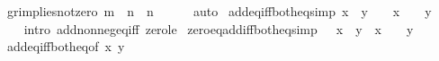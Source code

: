 \begin{isabellebody}
\endisatagproof
{\isafoldproof}%
%
\isadelimproof
\isanewline
%
\endisadelimproof
\isanewline
{}\isamarkupfalse%
\ gr{\isacharunderscore}{\kern0pt}implies{\isacharunderscore}{\kern0pt}not{\isacharunderscore}{\kern0pt}zero{\isacharcolon}{\kern0pt}\ {\isachardoublequoteopen}m\ {\isacharless}{\kern0pt}\ n\ {\isasymLongrightarrow}\ n\ {\isasymnoteq}\ {}{\isachardoublequoteclose}\isanewline
%
\isadelimproof
\ \ %
\endisadelimproof
%
\isatagproof
{}\isamarkupfalse%
\ auto%
\endisatagproof
{\isafoldproof}%
%
\isadelimproof
\isanewline
%
\endisadelimproof
\isanewline
{}\isamarkupfalse%
\ add{\isacharunderscore}{\kern0pt}eq{\isacharunderscore}{\kern0pt}{}{\isacharunderscore}{\kern0pt}iff{\isacharunderscore}{\kern0pt}both{\isacharunderscore}{\kern0pt}eq{\isacharunderscore}{\kern0pt}{}{\isacharbrackleft}{\kern0pt}simp{\isacharbrackright}{\kern0pt}{\isacharcolon}{\kern0pt}\ {\isachardoublequoteopen}x\ {\isacharplus}{\kern0pt}\ y\ {\isacharequal}{\kern0pt}\ {}\ {\isasymlongleftrightarrow}\ x\ {\isacharequal}{\kern0pt}\ {}\ {\isasymand}\ y\ {\isacharequal}{\kern0pt}\ {}{\isachardoublequoteclose}\isanewline
%
\isadelimproof
\ \ %
\endisadelimproof
%
\isatagproof
{}\isamarkupfalse%
\ {\isacharparenleft}{\kern0pt}intro\ add{\isacharunderscore}{\kern0pt}nonneg{\isacharunderscore}{\kern0pt}eq{\isacharunderscore}{\kern0pt}{}{\isacharunderscore}{\kern0pt}iff\ zero{\isacharunderscore}{\kern0pt}le{\isacharparenright}{\kern0pt}%
\endisatagproof
{\isafoldproof}%
%
\isadelimproof
\isanewline
%
\endisadelimproof
\isanewline
{}\isamarkupfalse%
\ zero{\isacharunderscore}{\kern0pt}eq{\isacharunderscore}{\kern0pt}add{\isacharunderscore}{\kern0pt}iff{\isacharunderscore}{\kern0pt}both{\isacharunderscore}{\kern0pt}eq{\isacharunderscore}{\kern0pt}{}{\isacharbrackleft}{\kern0pt}simp{\isacharbrackright}{\kern0pt}{\isacharcolon}{\kern0pt}\ {\isachardoublequoteopen}{}\ {\isacharequal}{\kern0pt}\ x\ {\isacharplus}{\kern0pt}\ y\ {\isasymlongleftrightarrow}\ x\ {\isacharequal}{\kern0pt}\ {}\ {\isasymand}\ y\ {\isacharequal}{\kern0pt}\ {}{\isachardoublequoteclose}\isanewline
%
\isadelimproof
\ \ %
\endisadelimproof
%
\isatagproof
{}\isamarkupfalse%
\ add{\isacharunderscore}{\kern0pt}eq{\isacharunderscore}{\kern0pt}{}{\isacharunderscore}{\kern0pt}iff{\isacharunderscore}{\kern0pt}both{\isacharunderscore}{\kern0pt}eq{\isacharunderscore}{\kern0pt}{}{\isacharbrackleft}{\kern0pt}of\ x\ y{\isacharbrackright}{\kern0pt}\ \isamarkupfalse%

\end{isabellebody}
